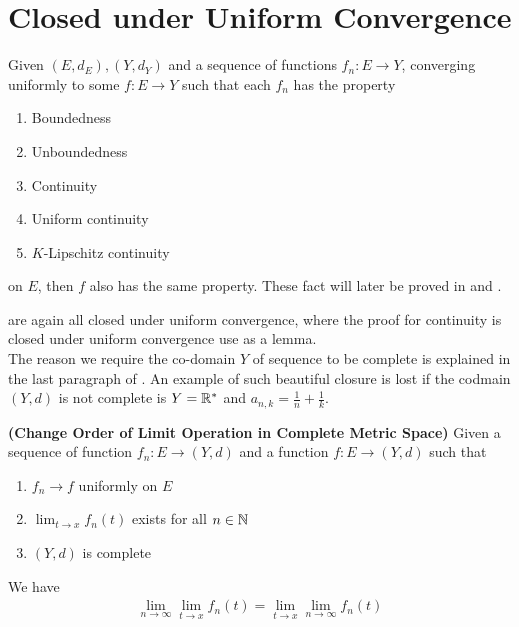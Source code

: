 \documentclass{report}
\begin{document}
\section{Closed under Uniform Convergence}
\begin{mdframed}
Given $(E,d_E),(Y,d_Y)$ and a sequence of functions $f_n:E\rightarrow Y$, converging uniformly to some $f:E\rightarrow Y$ such that each $f_n$ has the property 
\begin{enumerate}[label=(\alph*)]
  \item Boundedness 
  \item Unboundedness
  \item Continuity
  \item Uniform continuity
  \item $K$-Lipschitz continuity
\end{enumerate}
on $E$, then $f$ also has the same property. These fact will later be proved in \myref{}{} and \myref{}{}.







are again all closed under uniform convergence, where the proof for continuity is closed under uniform convergence use  as a lemma.\\

The reason we require the co-domain $Y$ of sequence to be complete is explained in the last paragraph of . An example of such beautiful closure is lost if the codmain $(Y,d)$ is not complete is $Y=\mathbb{R}^*$ and  $a_{n,k}=\frac{1}{n}+\frac{1}{k}$. 
\end{mdframed}
\begin{theorem}
\label{COiC}
\textbf{(Change Order of Limit Operation in Complete Metric Space)} Given a sequence of function $f_n:E\rightarrow (Y,d)$ and a function $f:E\rightarrow (Y,d)$ such that 
\begin{enumerate}[label=(\alph*)]
  \item $f_n\to f$ uniformly on $E$ 
   \item $\lim_{t\to x}f_n(t)$ exists for all $n \in\mathbb{N}$
    \item $(Y,d)$ is complete
\end{enumerate}
We have
\begin{align*}
\lim_{n\to \infty }\lim_{t\to x}f_n(t)=\lim_{t\to x}\lim_{n\to \infty}f_n(t)
\end{align*}
\end{theorem}
\end{document}
